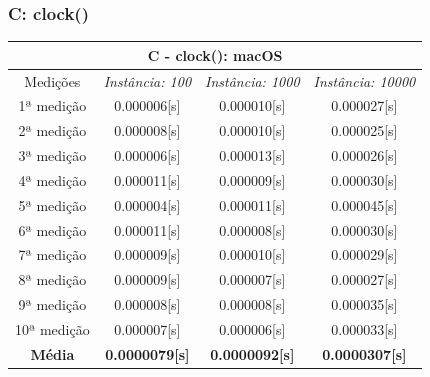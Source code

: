 \documentclass[12pt,a4paper,titlepage]{article}
\begin{document}
\clearpage\subsubsection{C: clock()}
\begin{center}
    \begin{tabular}{||c|c|c|c||}
        \hline
        \multicolumn{4}{||c||}{\textbf{C - clock(): macOS}}\\
        \hline \hline
        Medições & \textit{Instância: 100} & \textit{Instância: 1000} & \textit{Instância: 10000}\\
        \hline
        1ª medição & 0.000006[s] & 0.000010[s] & 0.000027[s]\\
        \hline
        2ª medição & 0.000008[s] & 0.000010[s] & 0.000025[s]\\
        \hline
        3ª medição & 0.000006[s] & 0.000013[s] & 0.000026[s]\\
        \hline
        4ª medição & 0.000011[s] & 0.000009[s] & 0.000030[s]\\
        \hline
        5ª medição & 0.000004[s] & 0.000011[s] & 0.000045[s]\\
        \hline
        6ª medição & 0.000011[s] & 0.000008[s] & 0.000030[s]\\
        \hline
        7ª medição & 0.000009[s] & 0.000010[s] & 0.000029[s]\\
        \hline
        8ª medição & 0.000009[s] & 0.000007[s] & 0.000027[s]\\
        \hline
        9ª medição & 0.000008[s] & 0.000008[s] & 0.000035[s]\\
        \hline
        10ª medição & 0.000007[s] & 0.000006[s] & 0.000033[s]\\
        \hline
        \textbf{Média} & \textbf{0.0000079[s]} & \textbf{0.0000092[s]} & \textbf{0.0000307[s]}\\
        \hline
    \end{tabular}
\end{center}
\end{document}
